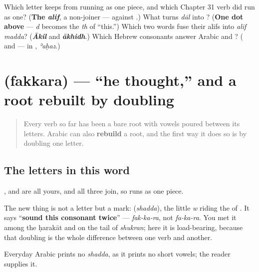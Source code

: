 \begin{tcolorbox}[breakable,colback=teal!4,colframe=teal!35!black,title={Before you move on}]
Which letter keeps \textbf{} from running as one piece, and which Chapter 31 verb did run as one? (\textbf{The \emph{alif}}, a non-joiner — against \textbf{}.) What turns \emph{dāl} into \textbf{}? (\textbf{One dot above} — \emph{d} becomes the \emph{th} of \textquotedblleft{}this.\textquotedblright{}) Which two words fuse their alifs into \emph{alif madda}? (\emph{\textbf{Ākil}} and \emph{\textbf{ākhidh}}.) Which Hebrew consonants answer Arabic \textbf{} and \textbf{}? (\textbf{} and \textbf{} — in \textbf{}, \emph{ʾaḥaz}.)
\end{tcolorbox}
\section[\texorpdfstring{\ar{فكّر} (fakkara)}{فكّر (fakkara)}]{ (fakkara) — \textquotedblleft{}he thought,\textquotedblright{} and a root rebuilt by doubling}

\label{lesson:AR-C32-fakkara}



\begin{quote}
Every verb so far has been a bare root with vowels poured between its letters. Arabic can also \textbf{rebuild} a root, and the first way it does so is by doubling one letter.
\end{quote}

\subsection*{The letters in this word}
\textbf{}, \textbf{} and \textbf{} are all yours, and all three join, so \textbf{} runs as one piece.

The new thing is not a letter but a mark: \textbf{} (\emph{shadda}), the little \emph{w} riding the \textbf{} of \textbf{}. It says \textquotedblleft{}\textbf{sound this consonant twice}\textquotedblright{} — \emph{fak-ka-ra}, not \emph{fa-ka-ra}. You met it among the ḥarakāt and on the tail of \emph{shukran}; here it is load-bearing, because that doubling is the whole difference between one verb and another.

Everyday Arabic prints no \emph{shadda}, as it prints no short vowels; the reader supplies it.

